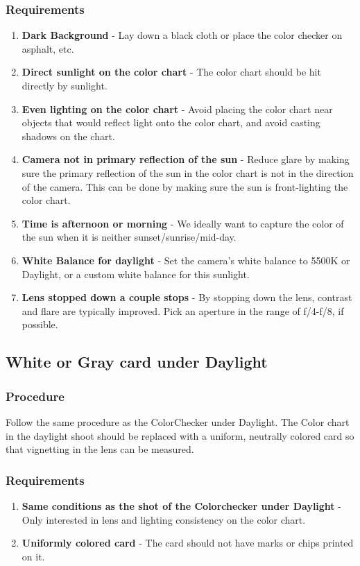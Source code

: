 \documentclass[twoside]{article}
\begin{document}
\subsubsection{Requirements}
\begin{enumerate}
    \item \textbf{Dark Background} - Lay down a black cloth or place the color checker on asphalt, etc.
    \item \textbf{Direct sunlight on the color chart} - The color chart should be hit directly by sunlight.
    \item \textbf{Even lighting on the color chart} - Avoid placing the color chart near objects that would reflect light onto the color chart, and avoid casting shadows on the chart.
    \item \textbf{Camera not in primary reflection of the sun} - Reduce glare by making sure the primary reflection of the sun in the color chart is not in the direction of the camera. This can be done by making sure the sun is front-lighting the color chart.
    \item \textbf{Time is afternoon or morning} - We ideally want to capture the color of the sun when it is neither sunset/sunrise/mid-day.
    \item \textbf{White Balance for daylight} - Set the camera's white balance to 5500K or Daylight, or a custom white balance for this sunlight.
    \item \textbf{Lens stopped down a couple stops} - By stopping down the lens, contrast and flare are typically improved. Pick an aperture in the range of f/4-f/8, if possible.
\end{enumerate}

\subsection{White or Gray card under Daylight}
\subsubsection{Procedure}
Follow the same procedure as the ColorChecker under Daylight. The Color chart in the daylight shoot should be replaced with a uniform, neutrally colored card so that vignetting in the lens can be measured.

\subsubsection{Requirements}
\begin{enumerate}
    \item \textbf{Same conditions as the shot of the Colorchecker under Daylight} - Only interested in lens and lighting consistency on the color chart.
    \item \textbf{Uniformly colored card} - The card should not have marks or chips printed on it.
\end{enumerate}
\end{document}
